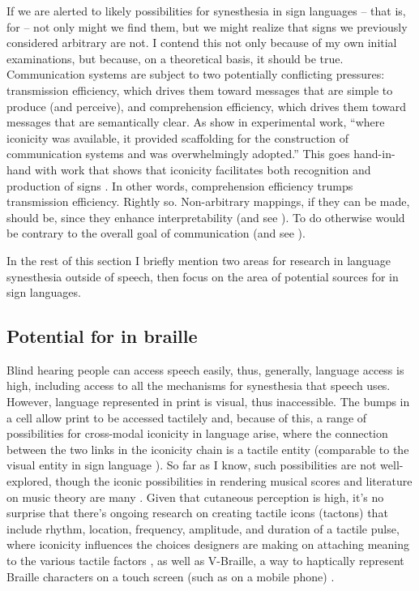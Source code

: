 \documentclass[output=paper,
modfonts
]{LSP/langsci}
\begin{document}
If we are alerted to likely possibilities for synesthesia in sign
languages -- that is, for  -- not only might we find
them, but we might realize that signs we previously considered arbitrary
are not. I contend this not only because of my own initial examinations,
but because, on a theoretical basis, it should be true. Communication
systems are subject to two potentially conflicting pressures:
transmission efficiency, which drives them toward messages that are
simple to produce (and perceive), and comprehension efficiency, which
drives them toward messages that are semantically clear. As \citet[52]{roberts2015} show in experimental work, ``where
iconicity was available, it provided scaffolding for the construction of
communication systems and was overwhelmingly adopted.'' This goes
hand-in-hand with work that shows that iconicity facilitates both
recognition and production of signs \citep{vinson2015}. In other
words, comprehension efficiency trumps transmission efficiency. Rightly
so. Non-arbitrary mappings, if they can be made, should be, since they
enhance interpretability (and see \citealt{givon1989}). To do otherwise would be
contrary to the overall goal of communication (and see \citealt{napoli-forthcoming}).

\newpage 
In the rest of this section I briefly mention two areas for research in
language synesthesia outside of speech, then focus on the area of
potential sources for  in sign languages.

\subsection{Potential for  in braille}

Blind hearing people can access speech easily, thus, generally, language
access is high, including access to all the mechanisms for synesthesia
that speech uses. However, language represented in print is visual, thus
inaccessible. The bumps in a  cell allow print to be accessed
tactilely and, because of this, a range of possibilities for cross-modal
iconicity in language arise, where the connection between the two links
in the iconicity chain is a tactile entity (comparable to the visual
entity in sign language ). So far as I know, such
possibilities are not well-explored, though the iconic possibilities in
rendering musical scores and literature on music theory are many \citep{pacun2009,johnson2009n}. Given that cutaneous perception is high, it's no
surprise that there's ongoing research on creating tactile icons
(tactons) that include rhythm, location, frequency, amplitude, and
duration of a tactile pulse, where iconicity influences the choices
designers are making on attaching meaning to the various tactile factors
\citep{brewster2004}, as well as V-Braille, a way to haptically
represent Braille characters on a touch screen (such as on a mobile
phone) \citep{jayant2010}.
\end{document}
